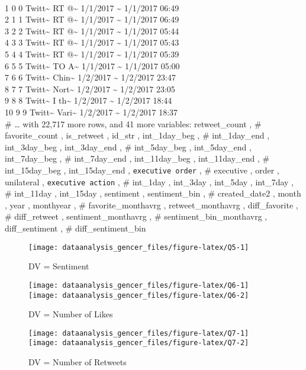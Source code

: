\documentclass[
]{article}
\begin{document}
\\
1 0 0 Twitt\textasciitilde{} RT @\textasciitilde{} 1/1/2017
\textasciitilde{} 1/1/2017 06:49\\
2 1 1 Twitt\textasciitilde{} RT @\textasciitilde{} 1/1/2017
\textasciitilde{} 1/1/2017 06:49\\
3 2 2 Twitt\textasciitilde{} RT @\textasciitilde{} 1/1/2017
\textasciitilde{} 1/1/2017 05:44\\
4 3 3 Twitt\textasciitilde{} RT @\textasciitilde{} 1/1/2017
\textasciitilde{} 1/1/2017 05:43\\
5 4 4 Twitt\textasciitilde{} RT @\textasciitilde{} 1/1/2017
\textasciitilde{} 1/1/2017 05:39\\
6 5 5 Twitt\textasciitilde{} TO A\textasciitilde{} 1/1/2017
\textasciitilde{} 1/1/2017 05:00\\
7 6 6 Twitt\textasciitilde{} Chin\textasciitilde{} 1/2/2017
\textasciitilde{} 1/2/2017 23:47\\
8 7 7 Twitt\textasciitilde{} Nort\textasciitilde{} 1/2/2017
\textasciitilde{} 1/2/2017 23:05\\
9 8 8 Twitt\textasciitilde{} I th\textasciitilde{} 1/2/2017
\textasciitilde{} 1/2/2017 18:44\\
10 9 9 Twitt\textasciitilde{} Vari\textasciitilde{} 1/2/2017
\textasciitilde{} 1/2/2017 18:37\\
\# \ldots{} with 22,717 more rows, and 41 more variables: retweet\_count
, \# favorite\_count , is\_retweet , id\_str , int\_1day\_beg , \#
int\_1day\_end , int\_3day\_beg , int\_3day\_end , \# int\_5day\_beg ,
int\_5day\_end , int\_7day\_beg , \# int\_7day\_end , int\_11day\_beg ,
int\_11day\_end , \# int\_15day\_beg , int\_15day\_end ,
\texttt{executive\ order} , \# executive , order , unilateral ,
\texttt{executive\ action} , \# int\_1day , int\_3day , int\_5day ,
int\_7day , \# int\_11day , int\_15day , sentiment , sentiment\_bin , \#
created\_date2 , month , year , monthyear , \# favorite\_monthavrg ,
retweet\_monthavrg , diff\_favorite , \# diff\_retweet ,
sentiment\_monthavrg , \# sentiment\_bin\_monthavrg , diff\_sentiment ,
\# diff\_sentiment\_bin

\begin{figure}[H]
\texttt{[image: dataanalysis\_gencer\_files/figure-latex/Q5-1]} \caption{DV = Sentiment}\label{fig:Q5}
\end{figure}

\begin{figure}[H]
\texttt{[image: dataanalysis\_gencer\_files/figure-latex/Q6-1]} \texttt{[image: dataanalysis\_gencer\_files/figure-latex/Q6-2]} \caption{DV = Number of Likes}\label{fig:Q6}
\end{figure}

\begin{figure}[H]
\texttt{[image: dataanalysis\_gencer\_files/figure-latex/Q7-1]} \texttt{[image: dataanalysis\_gencer\_files/figure-latex/Q7-2]} \caption{DV = Number of Retweets}\label{fig:Q7}
\end{figure}
\end{document}
